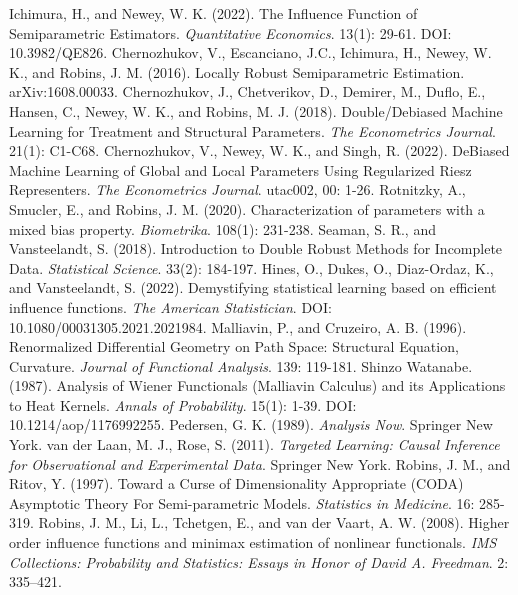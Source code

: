 \documentclass[uplatex,dvipdfmx]{jsreport}
\begin{document}
\begin{thebibliography}{99}
    Ichimura, H., and Newey, W. K. (2022). The Influence Function of Semiparametric Estimators. \textit{Quantitative Economics}. 13(1): 29-61. DOI: 10.3982/QE826.
    Chernozhukov, V., Escanciano, J.C., Ichimura, H., Newey, W. K., and Robins, J. M. (2016). Locally Robust Semiparametric Estimation. arXiv:1608.00033.
    Chernozhukov, J., Chetverikov, D., Demirer, M., Duflo, E., Hansen, C., Newey, W. K., and Robins, M. J. (2018). Double/Debiased Machine Learning for Treatment and Structural Parameters. \textit{The Econometrics Journal}. 21(1): C1-C68.
    Chernozhukov, V., Newey, W. K., and Singh, R. (2022). DeBiased Machine Learning of Global and Local Parameters Using Regularized Riesz Representers. \textit{The Econometrics Journal}. utac002, 00: 1-26.
    Rotnitzky, A., Smucler, E., and Robins, J. M. (2020). Characterization of parameters with a mixed bias property. \textit{Biometrika}. 108(1): 231-238.
    Seaman, S. R., and Vansteelandt, S. (2018). Introduction to Double Robust Methods for Incomplete Data. \textit{Statistical Science}. 33(2): 184-197.
    Hines, O., Dukes, O., Diaz-Ordaz, K., and Vansteelandt, S. (2022). Demystifying statistical learning based on efficient influence functions. \textit{The American Statistician}. DOI: 10.1080/00031305.2021.2021984.
    Malliavin, P., and Cruzeiro, A. B. (1996). Renormalized Differential Geometry on Path Space: Structural Equation, Curvature. \textit{Journal of Functional Analysis}. 139: 119-181.
    Shinzo Watanabe. (1987). Analysis of Wiener Functionals (Malliavin Calculus) and its Applications to Heat Kernels. \textit{Annals of Probability}. 15(1): 1-39. DOI: 10.1214/aop/1176992255.
    Pedersen, G. K. (1989). \textit{Analysis Now}. Springer New York.
    van der Laan, M. J., Rose, S. (2011). \textit{Targeted Learning: Causal Inference for Observational and Experimental Data}. Springer New York.
    Robins, J. M., and Ritov, Y. (1997). Toward a Curse of Dimensionality Appropriate (CODA) Asymptotic Theory For Semi-parametric Models. \textit{Statistics in Medicine}. 16: 285-319.
    Robins, J. M., Li, L., Tchetgen, E., and van der Vaart, A. W. (2008). Higher order influence functions and minimax estimation of nonlinear functionals. \textit{IMS Collections: Probability and Statistics: Essays in Honor of David A. Freedman}. 2: 335–421.

\end{thebibliography}
\end{document}
